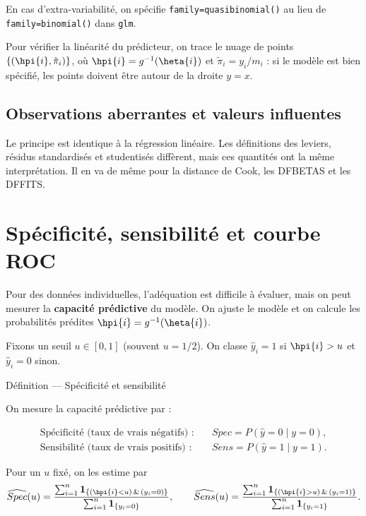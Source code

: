 \documentclass[
  french,
  letterpaper,
  DIV=11,
  numbers=noendperiod]{scrreprt}
\begin{document}
En cas d'extra-variabilité, on spécifie \texttt{family=quasibinomial()}
au lieu de \texttt{family=binomial()} dans \texttt{glm}.

Pour vérifier la linéarité du prédicteur, on trace le nuage de points
\(\{(\hpi{i}, \tilde\pi_i)\}\), où \(\hpi{i} = g^{-1}(\heta{i})\) et
\(\tilde\pi_i = y_i/m_i\) : si le modèle est bien spécifié, les points
doivent être autour de la droite \(y=x\).

\subsection{Observations aberrantes et valeurs
influentes}\label{observations-aberrantes-et-valeurs-influentes}

Le principe est identique à la régression linéaire. Les définitions des
leviers, résidus standardisés et studentisés diffèrent, mais ces
quantités ont la même interprétation. Il en va de même pour la distance
de Cook, les DFBETAS et les DFFITS.

\section{Spécificité, sensibilité et courbe ROC}\label{sec-roc}

Pour des données individuelles, l'adéquation est difficile à évaluer,
mais on peut mesurer la \textbf{capacité prédictive} du modèle. On
ajuste le modèle et on calcule les probabilités prédites
\(\hpi{i} = g^{-1}(\heta{i})\).

Fixons un seuil \(u \in [0,1]\) (souvent \(u=1/2\)). On classe
\(\hat y_i = 1\) si \(\hpi{i} > u\) et \(\hat y_i = 0\) sinon.

{Définition --- Spécificité et sensibilité}

On mesure la capacité prédictive par :

\[
\begin{aligned}
\text{Spécificité (taux de vrais négatifs) :}\quad & Spec = P(\hat y = 0 \mid y = 0),\\
\text{Sensibilité (taux de vrais positifs) :}\quad & Sens = P(\hat y = 1 \mid y = 1).
\end{aligned}
\]

Pour un \(u\) fixé, on les estime par
\[\widehat{Spec}(u) = \frac{\sum_{i=1}^n \mathbf{1}_{\{(\hpi{i} < u)\,\&\,(y_i = 0)\}}}{\sum_{i=1}^n \mathbf{1}_{\{y_i = 0\}}},
\qquad
\widehat{Sens}(u) = \frac{\sum_{i=1}^n \mathbf{1}_{\{(\hpi{i} > u)\,\&\,(y_i = 1)\}}}{\sum_{i=1}^n \mathbf{1}_{\{y_i = 1\}}}.\]
\end{document}
